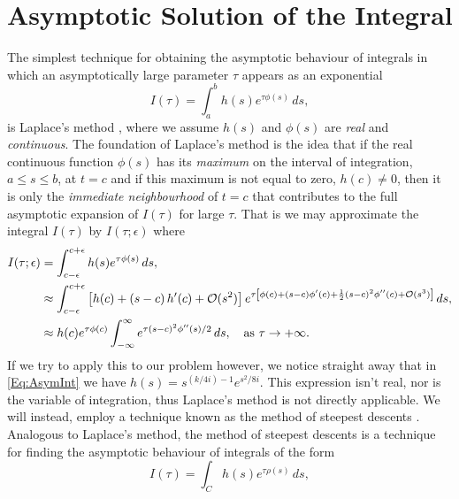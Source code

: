 
\section{Asymptotic Solution of the Integral} \label{Sec:Asymp}

The simplest technique for obtaining the asymptotic behaviour of integrals in which an asymptotically large parameter $\tau$ appears as an exponential
\begin{equation}
	I(\tau) = \int_{a}^{b} h(s) e^{\tau\phi(s)} \, ds,
\end{equation}
is Laplace's method \cite{Bender1999}, where we assume $h(s)$ and $\phi(s)$ are \emph{real} and \emph{continuous}. 
The foundation of Laplace's method is the idea that if the real continuous function $\phi(s)$ has its \emph{maximum} on the interval of integration, $a \le s \le b$, at $t = c$ and if this maximum is not equal to zero, $h(c) \ne 0$, then it is only the \emph{immediate neighbourhood} of $t=c$ that contributes to the full asymptotic expansion of $I(\tau)$ for large $\tau$. 
That is we may approximate the integral $I(\tau)$ by $I(\tau; \epsilon)$ where
\begin{align}
	I(\tau;\epsilon) &= \int_{c-\epsilon}^{c+\epsilon}h(s) e^{\tau\phi(s)}\, ds,\\
	&\approx \int_{c-\epsilon}^{c+\epsilon}\left[h(c) + \left(s-c\right)h'(c) + {\cal O}(s^{2})\right]e^{\tau\left[\phi(c)+\left(s-c\right)\phi'(c) + \frac{1}{2}\left(s-c\right)^{2}\phi''(c)+{\cal O}(s^{3})\right]}\, ds,\\
	&\approx h(c)e^{\tau\phi(c)}\int_{-\infty}^{\infty} e^{\tau\left(s-c\right)^{2}\phi''(s)/2}\, ds, \quad \text{as }\tau \to + \infty. \label{Eq:Laplace}
\end{align}
If we try to apply this to our problem however, we notice straight away that in \autoref{Eq:AsymInt} we have $h(s) = s^{(k/4i)-1}e^{s^{2}/8i}$. This expression isn't real, nor is the variable of integration, thus Laplace's method is not directly applicable.
We will instead, employ a technique known as the method of steepest descents \cite{Bender1999}. 
Analogous to Laplace's method, the method of steepest descents is a technique for finding the asymptotic behaviour of integrals of the form
\begin{equation}
	I(\tau) = \int_{C}h(s) e^{\tau \rho(s)} \, ds, \label{Eq:SteepestDescent}
\end{equation}
